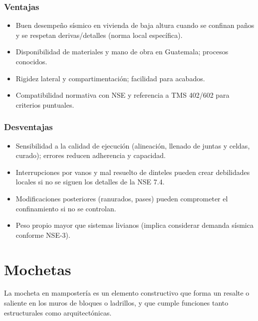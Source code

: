 \documentclass[12pt]{article}
\begin{document}
	\subsubsection{Ventajas}
	\begin{itemize}
		\item Buen desempeño sísmico en vivienda de baja altura cuando se confinan paños y se respetan derivas/detalles (norma local específica).
		\item Disponibilidad de materiales y mano de obra en Guatemala; procesos conocidos.
		\item Rigidez lateral y compartimentación; facilidad para acabados.
		\item Compatibilidad normativa con NSE y referencia a TMS 402/602 para criterios puntuales.
	\end{itemize}
	
	\subsubsection{Desventajas}
	\begin{itemize}
		\item Sensibilidad a la calidad de ejecución (alineación, llenado de juntas y celdas, curado); errores reducen adherencia y capacidad.
		\item Interrupciones por vanos y mal resuelto de dinteles pueden crear debilidades locales si no se siguen los detalles de la NSE 7.4.
		\item Modificaciones posteriores (ranurados, pases) pueden comprometer el confinamiento si no se controlan.
		\item Peso propio mayor que sistemas livianos (implica considerar demanda sísmica conforme NSE-3).
	\end{itemize}
	
	

	
	
	
	
	
	
	
	
	\section{Mochetas}
	
	La mocheta en mampostería es un elemento constructivo que forma un resalte o saliente en los muros de bloques o ladrillos, y que cumple funciones tanto estructurales como arquitectónicas.
	  
\end{document}
